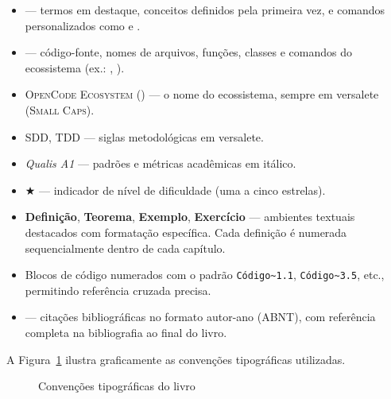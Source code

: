 \begin{itemize}
  \item {} --- termos em destaque, conceitos definidos pela
        primeira vez, e comandos personalizados como 
        e .
  \item {} --- código-fonte, nomes de arquivos,
        funções, classes e comandos do ecossistema (ex.:
        , ).
  \item \textsc{OpenCode Ecosystem} (\opencodeeco{}) --- o nome do
        ecossistema, sempre em versalete (\textsc{Small Caps}).
  \item \textsc{SDD}, \textsc{TDD} --- siglas metodológicas em versalete.
  \item \textit{Qualis A1} --- padrões e métricas acadêmicas em itálico.
  \item $\bigstar$ --- indicador de nível de dificuldade (uma a cinco
        estrelas).
  \item \textbf{Definição}, \textbf{Teorema}, \textbf{Exemplo},
        \textbf{Exercício} --- ambientes textuais destacados com
        formatação específica. Cada definição é numerada sequencialmente
        dentro de cada capítulo.
  \item Blocos de código numerados com o padrão
        \lstinline{Código~1.1}, \lstinline{Código~3.5}, etc., permitindo
        referência cruzada precisa.
  \item \cite{beck2002tdd} --- citações bibliográficas no formato
        autor-ano (ABNT), com referência completa na bibliografia ao
        final do livro.
\end{itemize}

A Figura~\ref{fig:convencoes} ilustra graficamente as convenções tipográficas
utilizadas.

\begin{figure}[htb]
\centering
\caption{Convenções tipográficas do livro}
\label{fig:convencoes}
\end{figure}

